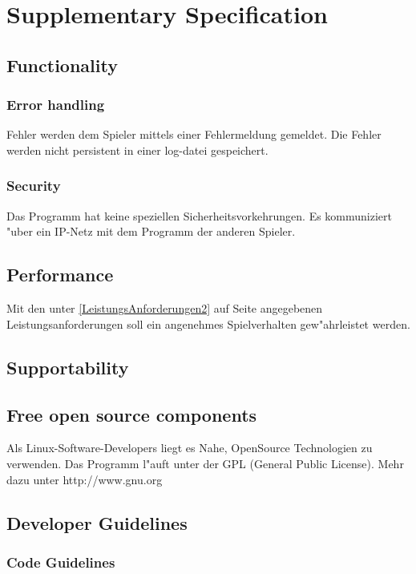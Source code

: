 \chapter{Supplementary Specification}

\section{Functionality}

\subsection{Error handling}
Fehler werden dem Spieler mittels einer Fehlermeldung gemeldet.
Die Fehler werden nicht persistent in einer log-datei gespeichert.

\subsection{Security}
Das Programm hat keine speziellen Sicherheitsvorkehrungen. Es kommuniziert "uber ein IP-Netz mit dem Programm der anderen Spieler.

\section{Performance}
Mit den unter \ref{LeistungsAnforderungen2} auf Seite \pageref{LeistungsAnforderungen2} angegebenen Leistungsanforderungen soll ein angenehmes Spielverhalten gew"ahrleistet werden.
\section{Supportability}

\section{Free open source components}
Als Linux-Software-Developers liegt es Nahe, OpenSource Technologien zu verwenden. Das Programm l"auft unter der GPL (General Public License).
Mehr dazu unter http://www.gnu.org

\section{Developer Guidelines}

\subsection{Code Guidelines}

